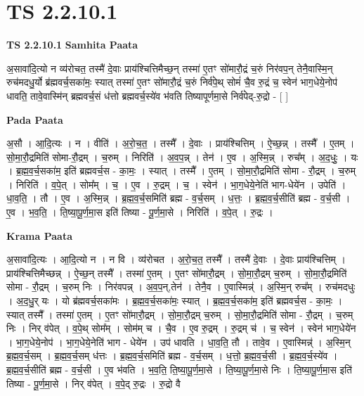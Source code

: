 \documentclass[17pt]{extarticle}
\begin{document}
\section*{ TS 2.2.10.1 }

\textbf{TS 2.2.10.1 } \newline
\textbf{Samhita Paata} \newline

अ॒सावा॑दि॒त्यो न व्य॑रोचत॒ तस्मै॑ दे॒वाः प्राय॑श्चित्तिमैच्छ॒न् तस्मा॑ ए॒तꣳ सो॑मारौ॒द्रं च॒रुं निर॑वप॒न् तेनै॒वास्मि॒न् रुच॑मदधु॒र्यो ब्र॑ह्मवर्च॒सका॑मः॒ स्यात् तस्मा॑ ए॒तꣳ सो॑मारौ॒द्रं च॒रुं निर्व॑पे॒थ् सोमं॑ चै॒व रु॒द्रं च॒ स्वेन॑ भाग॒धेये॒नोप॑ धावति॒ तावे॒वास्मि॑न् ब्रह्मवर्च॒सं ध॑त्तो ब्रह्मवर्च॒स्ये॑व भ॑वति तिष्यापूर्णमा॒से निर्व॑पेद्-रु॒द्रो - [  ] \newline

\textbf{Pada Paata} \newline

अ॒सौ । आ॒दि॒त्यः । न । वीति॑ । अ॒रो॒च॒त॒ । तस्मै᳚ । दे॒वाः । प्राय॑श्चित्तिम् । ऐ॒च्छ॒न्न् । तस्मै᳚ । ए॒तम् । सो॒मा॒रौ॒द्रमिति॑ सोमा-रौ॒द्रम् । च॒रुम् । निरिति॑ । अ॒व॒प॒न्न् । तेन॑ । ए॒व । अ॒स्मि॒न्न् । रुच᳚म् । अ॒द॒धुः॒ । यः । ब्र॒ह्म॒व॒र्च॒सका॑म॒ इति॑ ब्रह्मवर्च॒स - का॒मः॒ । स्यात् । तस्मै᳚ । ए॒तम् । सो॒मा॒रौ॒द्रमिति॑ सोमा - रौ॒द्रम् । च॒रुम् । निरिति॑ । व॒पे॒त् । सोम᳚म् । च॒ । ए॒व । रु॒द्रम् । च॒ । स्वेन॑ । भा॒ग॒धेये॒नेति॑ भाग-धेये॑न । उपेति॑ । धा॒व॒ति॒ । तौ । ए॒व । अ॒स्मि॒न्न् । ब्र॒ह्म॒व॒र्च॒समिति॑ ब्रह्म - व॒र्च॒सम् । ध॒त्तः॒ । ब्र॒ह्म॒व॒र्च॒सीति॑ ब्रह्म - व॒र्च॒सी । ए॒व । भ॒व॒ति॒ । ति॒ष्या॒पू॒र्ण॒मा॒स इति॑ तिष्या - पू॒र्ण॒मा॒से । निरिति॑ । व॒पे॒त् । रु॒द्रः ।  \newline


\textbf{Krama Paata} \newline

अ॒सावा॑दि॒त्यः । आ॒दि॒त्यो न । न वि । व्य॑रोचत । अ॒रो॒च॒त॒ तस्मै᳚ । तस्मै॑ दे॒वाः । दे॒वाः प्राय॑श्चित्तिम् । प्राय॑श्चित्तिमैच्छन्न् । ऐ॒च्छ॒न् तस्मै᳚ । तस्मा॑ ए॒तम् । ए॒तꣳ सो॑मारौ॒द्रम् । सो॒मा॒रौ॒द्रम् च॒रुम् । सो॒मा॒रौ॒द्रमिति॑ सोमा - रौ॒द्रम् । च॒रुम् निः । निर॑वपन्न् । अ॒व॒प॒न्,तेन॑ । तेनै॒व । ए॒वास्मिन्न्॑ । अ॒स्मि॒न् रुच᳚म् । रुच॑मदधुः । अ॒द॒धु॒र् यः । यो ब्र॑ह्मवर्च॒सका॑मः । ब्र॒ह्म॒व॒र्च॒सका॑मः॒ स्यात् । ब्र॒ह्म॒व॒र्च॒सका॑म॒ इति॑ ब्रह्मवर्च॒स - का॒मः॒ । स्यात् तस्मै᳚ । तस्मा॑ ए॒तम् । ए॒तꣳ सो॑मारौ॒द्रम् । सो॒मा॒रौ॒द्रम् च॒रुम् । सो॒मा॒रौ॒द्रमिति॑ सोमा - रौ॒द्रम् । च॒रुम् निः । निर् व॑पेत् । व॒पे॒थ् सोम᳚म् । सोम॑म् च । चै॒व । ए॒व रु॒द्रम् । रु॒द्रम् च॑ । च॒ स्वेन॑ । स्वेन॑ भाग॒धेये॑न । भा॒ग॒धेये॒नोप॑ । भा॒ग॒धेये॒नेति॑ भाग - धेये॑न । उप॑ धावति । धा॒व॒ति॒ तौ । तावे॒व । ए॒वास्मिन्न्॑ । अ॒स्मि॒न् ब्र॒ह्म॒व॒र्च॒सम् । ब्र॒ह्म॒व॒र्च॒सम् ध॑त्तः । ब्र॒ह्म॒व॒र्च॒समिति॑ ब्रह्म - व॒र्च॒सम् । ध॒त्तो॒ ब्र॒ह्म॒व॒र्च॒सी । ब्र॒ह्म॒व॒र्च॒स्ये॑व । ब्र॒ह्म॒व॒र्च॒सीति॑ ब्रह्म - व॒र्च॒सी । ए॒व भ॑वति । भ॒व॒ति॒ ति॒ष्या॒पू॒र्ण॒मा॒से । ति॒ष्या॒पू॒र्ण॒मा॒से निः । ति॒ष्या॒पू॒र्ण॒मा॒स इति॑ तिष्या - पू॒र्ण॒मा॒से । निर् व॑पेत् । व॒पे॒द् रु॒द्रः । रु॒द्रो वै \newline
\end{document}
